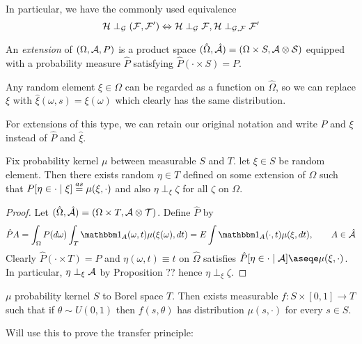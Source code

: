 In particular, we have the commonly used equivalence
\[
  \mathcal{H} \perp_{\mathcal{G}} (\mathcal{F}, \mathcal{F}') \Leftrightarrow \mathcal{H} \perp_{\mathcal{G}} \mathcal{F}, \mathcal{H} \perp_{\mathcal{G}, \mathcal{F}} \mathcal{F}'
\]

\begin{definition}
  An \emph{extension} of $(\Omega, \mathcal{A}, P)$ is a product space
  $(\hat{\Omega}, \hat{\mathcal{A}}) = (\Omega \times S, \mathcal{A} \otimes \mathcal{S})$
  equipped with a probability measure $\hat{P}$ satisfying
  $\hat{P}(\cdot \times S) = P$.
\end{definition}

Any random element $\xi \in \Omega$ can be regarded as a function on
$\hat\Omega$, so we can replace $\xi$ with $\hat\xi(\omega,s) = \xi(\omega)$
which clearly has the same distribution.

For extensions of this type, we can retain our original notation
and write $P$ and $\xi$ instead of $\hat{P}$ and $\hat\xi$.

\begin{lemma}[Extension]
  Fix probability kernel $\mu$ between measurable $S$ and $T$.
  let $\xi \in S$ be random element.
  Then there exists random $\eta \in T$ defined on some extension of
  $\Omega$ such that 
  $P[\eta \in \cdot \mid \xi] \overset{as}{=} \mu(\xi, \cdot)$
  and also $\eta \perp_\xi \zeta$ for all $\zeta$ on $\Omega$.
\end{lemma}

\begin{proof}
  Let $(\hat\Omega, \hat{\mathcal{A}}) = (\Omega \times T, \mathcal{A} \otimes \mathcal{T})$.
  Define $\hat{P}$ by
  \[
    \hat{P} A 
    = \int_\Omega P(d\omega) \int_T \ind_A(\omega, t) \mu(\xi(\omega), dt)
    = E \int \ind_A(\cdot, t) \mu(\xi, dt), \qquad A \in \hat\cA
  \]
  Clearly $\hat{P}(\cdot \times T) = P$ and $\eta(\omega, t) \equiv t$
  on $\hat\Omega$ satisfies
  $\hat{P}[\eta \in \cdot \mid \cA] \aseqe \mu(\xi, \cdot)$.
  In particular, $\eta \perp_\xi \mathcal{A}$ by
  Proposition ?? hence $\eta \perp_\xi \zeta$.
\end{proof}

\begin{lemma}
  $\mu$ probability kernel $S$ to Borel space $T$.
  Then exists measurable $f : S \times [0,1] \to T$ such that
  if $\theta \sim U(0,1)$ then
  $f(s,\theta)$ has distribution $\mu(s,\cdot)$ for every $s \in S$.
\end{lemma}

Will use this to prove the transfer principle:

